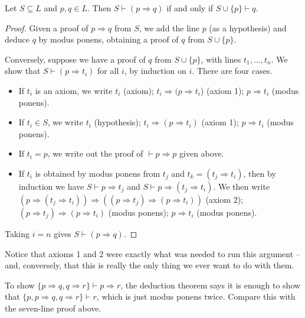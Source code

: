 \documentclass[a4paper]{scrartcl}
\begin{document}
\begin{theorem}\label{thm:deduction}
  Let $S \subseteq L$ and $p, q \in L$. Then $S \vdash (p \Rightarrow q)$ if and only if $S \cup \{p\} \vdash q$.
\end{theorem}
\begin{proof}
Given a proof of $p \Rightarrow q$ from $S$, we add the line $p$ (as a hypothesis) and deduce $q$ by modus ponens, obtaining a proof of $q$ from $S \cup \{p\}$.

Conversely, suppose we have a proof of $q$ from $S \cup\{p\}$, with lines $t_1, \ldots, t_n$. We show that $S \vdash (p \Rightarrow t_i)$ for all $i$, by induction on $i$. There are four cases.
\begin{itemize}
  \item If $t_i$ is an axiom, we write $t_i$ (axiom); $t_i \Rightarrow(p \Rightarrow t_i$) (axiom 1); $p \Rightarrow t_i$ (modus ponens).
  \item If $t_i \in S$, we write $t_i$ (hypothesis); $t_i \Rightarrow(p \Rightarrow t_i)$ (axiom 1); $p \Rightarrow t_i$ (modus ponens).
  \item If $t_i = p$, we write out the proof of $\vdash p \Rightarrow p$ given above.
  \item If $t_i$ is obtained by modus ponens from $t_j$ and $t_k = (t_j \Rightarrow t_i)$, then by induction we have $S \vdash p \Rightarrow t_j$ and $S \vdash p \Rightarrow (t_j \Rightarrow t_i)$. We then write
  $\left(p \Rightarrow\left(t_j \Rightarrow t_i\right)\right) \Rightarrow\left(\left(p \Rightarrow t_j\right) \Rightarrow\left(p \Rightarrow t_i\right)\right)$ (axiom 2); $\left(p \Rightarrow t_j\right) \Rightarrow\left(p \Rightarrow t_i\right)$ (modus ponens); $p \Rightarrow t_i$ (modus ponens).
\end{itemize}
Taking $i = n$ gives $S \vdash (p \Rightarrow q)$.
\end{proof}

Notice that axioms 1 and 2 were exactly what was needed to run this argument -- and, conversely, that this is really the only thing we ever want to do with them.

\begin{example}
  To show $\{p \Rightarrow q, q \Rightarrow r\} \vdash p \Rightarrow r$, the deduction theorem says it is enough to show that $\{p, p\Rightarrow q, q \Rightarrow r\} \vdash r$, which is just modus ponens twice. Compare this with the seven-line proof above.
\end{example}
\end{document}
